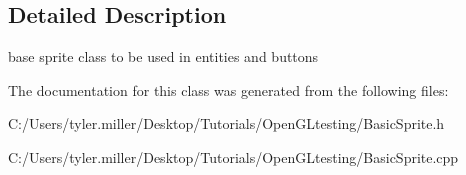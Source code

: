 \subsection{Detailed Description}
base sprite class to be used in entities and buttons 

The documentation for this class was generated from the following files\+:\begin{DoxyCompactItemize}
\item 
C\+:/\+Users/tyler.\+miller/\+Desktop/\+Tutorials/\+Open\+G\+Ltesting/Basic\+Sprite.\+h\item 
C\+:/\+Users/tyler.\+miller/\+Desktop/\+Tutorials/\+Open\+G\+Ltesting/Basic\+Sprite.\+cpp\end{DoxyCompactItemize}
